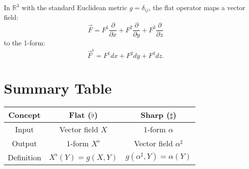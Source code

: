 \documentclass{article}
\begin{document}
	In \( \mathbb{R}^3 \) with the standard Euclidean metric \( g = \delta_{ij} \), the flat operator maps a vector field:
	\[
	\vec{F} = F^1 \frac{\partial}{\partial x} + F^2 \frac{\partial}{\partial y} + F^3 \frac{\partial}{\partial z}
	\]
	to the 1-form:
	\[
	\vec{F}^\flat = F^1 dx + F^2 dy + F^3 dz.
	\]
	
	\section*{Summary Table}
	
	\begin{center}
		\begin{tabular}{|c|c|c|}
			\hline
			\textbf{Concept} & \textbf{Flat (\(\flat\))} & \textbf{Sharp (\(\sharp\))} \\
			\hline
			Input & Vector field \( X \) & 1-form \( \alpha \) \\
			Output & 1-form \( X^\flat \) & Vector field \( \alpha^\sharp \) \\
			Definition & \( X^\flat(Y) = g(X, Y) \) & \( g(\alpha^\sharp, Y) = \alpha(Y) \) \\
			\hline
		\end{tabular}
	\end{center}
	
\end{document}
